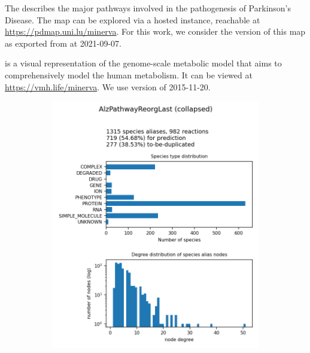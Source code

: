 \documentclass[
	fontsize=10pt, %
	twoside=true, %
	secnumdepth=1, %
  toc=indentunnumbered %
]{kaobook}
\begin{document}
The  \cite{fujita_IntegratingPathwaysParkinson_2014} describes the
major pathways involved in the pathogenesis of Parkinson's Disease. The map can
be explored via a hosted  instance, reachable at
\url{https://pdmap.uni.lu/minerva}. For this work, we consider the version of
this map as exported from  at 2021-09-07.

\cite{noronha_ReconMapInteractiveVisualization_2017}
is a visual representation of the genome-scale metabolic model
 \cite{thiele_CommunitydrivenGlobalReconstruction_2013} that aims
to comprehensively model the human metabolism. It can be viewed at \url{https://vmh.life/minerva}.
We use version  of 2015-11-20.

\begin{figure}[h]
  \centering
  \begin{subfigure}{0.32\textwidth}
    \includegraphics[width=\linewidth]{generated/AlzPathwayReorgLast.png}
  \end{subfigure} 
  \begin{subfigure}{0.32\textwidth}

\end{subfigure}
\end{figure}
\end{document}
